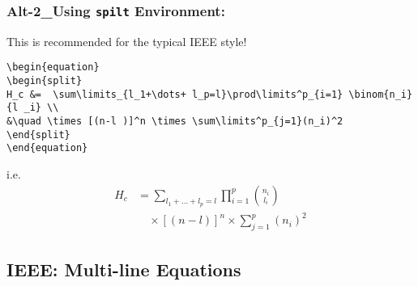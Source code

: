 \subsubsection{Alt-2\_Using \texttt{spilt} Environment:}
This is recommended for the typical IEEE style!
%
%
\begin{verbatim}
\begin{equation} 
\begin{split}
H_c &=  \sum\limits_{l_1+\dots+ l_p=l}\prod\limits^p_{i=1} \binom{n_i}{l _i} \\
&\quad \times [(n-l )]^n \times \sum\limits^p_{j=1}(n_i)^2
\end{split}
\end{equation}
\end{verbatim}
%
i.e.
%
\begin{equation} 
\begin{split}
H_c &=  \sum\limits_{l_1+\dots+ l_p=l}\prod\limits^p_{i=1} \binom{n_i}{l _i} \\
&\quad \times [(n-l )]^n \times \sum\limits^p_{j=1}(n_i)^2
\end{split}
\end{equation}
%
%
\subsection{IEEE: Multi-line  Equations}
%
